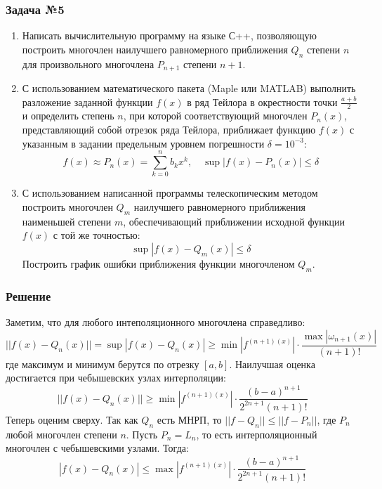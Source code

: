 \documentclass[a4paper, fontsize=14pt]{article}
\begin{document}
    \subsubsection*{Задача №5}
    \begin{enumerate}
        \item Написать вычислительную программу на языке С++, позволяющую построить многочлен наилучшего равномерного приближения $Q_n$ степени $n$ для произвольного многочлена $P_{n+1}$ степени $n+1$.
        \item С использованием математического пакета (Maple или MATLAB) выполнить разложение заданной функции $f(x)$ в ряд Тейлора в окрестности точки $\frac{a+b}{2}$ и определить степень $n$, при которой соответствующий многочлен $P_n(x)$, представляющий собой отрезок ряда Тейлора, приближает функцию $f(x)$ с указанным в задании предельным уровнем погрешности $\delta = 10^{-3}$:
        \begin{equation*}
            f(x) \approx P_n (x)=\sum_{k=0}^n b_k x^k,  \quad    \operatorname{sup} |f(x)-P_n (x)| \leq \delta
        \end{equation*}
        \item 	С использованием написанной программы телескопическим методом построить многочлен $Q_m$ наилучшего равномерного приближения наименьшей степени $m$, обеспечивающий приближении исходной функции $f(x)$ с той же точностью:
        \begin{equation*}
            \operatorname{sup} |f(x)-Q_m (x)| \leq \delta
        \end{equation*}
        Построить график ошибки приближения функции многочленом $Q_m$.
        
    \end{enumerate}
    \subsubsection*{Решение}

    Заметим, что для любого интеполяционного многочлена справедливо:
    \begin{equation*}
        || f(x) - Q_n(x) || = \operatorname{sup} | f(x) - Q_n(x) | \geq \operatorname{min}|f^{(n+1) (x)} | \cdot \frac{\operatorname{max}|\omega_{n+1}(x)|}{(n+1)!}
    \end{equation*}
    где максимум и минимум берутся по отрезку $[a, b]$.
    Наилучшая оценка достигается при чебышевских узлах интерполяции:
    \begin{equation}
        \label{mnrp_est1}
        || f(x) - Q_n(x) || \geq \operatorname{min}|f^{(n+1) (x)} | \cdot \frac{(b-a)^{n+1}}{2^{2n+1} (n+1)!}
    \end{equation}
    Теперь оценим сверху. Так как $Q_n$ есть МНРП, то $||f - Q_n || \leq || f - P_n ||$, где $P_n$ любой многочлен степени $n$. Пусть $P_n = L_n$, то есть интерполяционный многочлен с чебышевскими узлами. Тогда:
    \begin{equation*}
        | f(x) - Q_n(x) | \leq \operatorname{max} |f^{(n+1)(x)}| \cdot \frac{(b-a)^{n+1}}{2^{2n+1} (n+1)!}
    \end{equation*}
\end{document}
